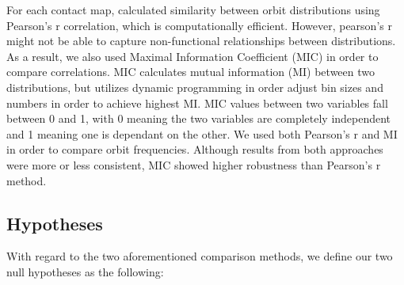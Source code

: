 \documentclass[a4,center,fleqn]{NAR}
\begin{document}
For each contact map,  calculated
similarity between orbit distributions using Pearson's r 
correlation, which is computationally efficient.
However, pearson's r might not be able to capture
non-functional relationships between distributions. As a result, we
also used Maximal Information Coefficient (MIC) 
\cite{reshef2011detecting} in order to compare
correlations. MIC calculates mutual information (MI) between two
distributions, but utilizes dynamic programming in order adjust
bin sizes and numbers in order to achieve highest MI.
MIC values between two variables fall between 0 and 1,
with 0 meaning the two variables are completely independent
and 1 meaning one is dependant on the other.
We used both Pearson's r and MI in order to compare orbit
frequencies. Although results from both approaches were more
or less consistent, MIC showed higher robustness than Pearson's 
r method.

\subsection{Hypotheses}

With regard to the two aforementioned comparison methods, we define
our two null hypotheses as the following:
\end{document}
